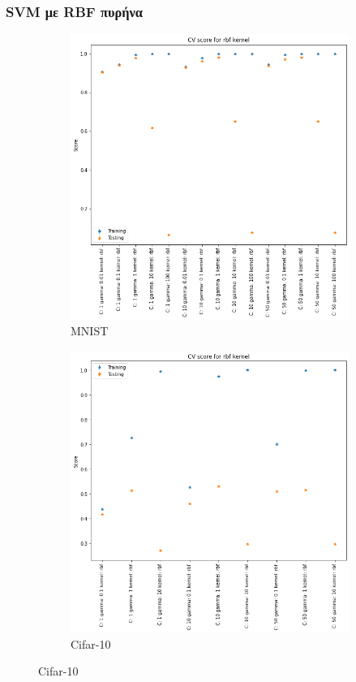 \documentclass{beamer}
\begin{document}
\begin{frame}
\frametitle{SVM με RBF πυρήνα}

\begin{figure}[H]
    \centering

    \begin{subfigure}[t]{0.45\linewidth}
    \includegraphics[width=\linewidth]{figures/mnist/cv_results_rbf.png}
    \caption{MNIST}
    \end{subfigure}
    \begin{subfigure}[t]{0.45\linewidth}
    \includegraphics[width=\linewidth]{figures/cifar/cv_results_rbf.png}
    \caption{Cifar-10}
    \end{subfigure}


\end{figure}
\end{frame}
\end{document}
